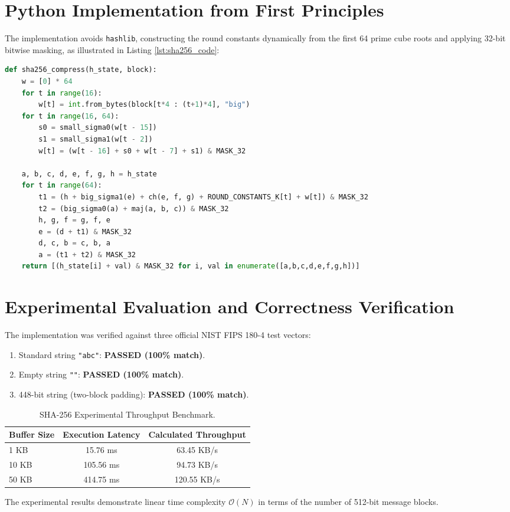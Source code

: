 \clearpage
\section{Python Implementation from First Principles}
The implementation avoids \texttt{hashlib}, constructing the round constants dynamically from the first 64 prime cube roots and applying 32-bit bitwise masking, as illustrated in Listing \ref{lst:sha256_code}:
\begin{lstlisting}[language=Python, caption={Core compression loop of SHA-256.}, label={lst:sha256_code}]
def sha256_compress(h_state, block):
    w = [0] * 64
    for t in range(16):
        w[t] = int.from_bytes(block[t*4 : (t+1)*4], "big")
    for t in range(16, 64):
        s0 = small_sigma0(w[t - 15])
        s1 = small_sigma1(w[t - 2])
        w[t] = (w[t - 16] + s0 + w[t - 7] + s1) & MASK_32

    a, b, c, d, e, f, g, h = h_state
    for t in range(64):
        t1 = (h + big_sigma1(e) + ch(e, f, g) + ROUND_CONSTANTS_K[t] + w[t]) & MASK_32
        t2 = (big_sigma0(a) + maj(a, b, c)) & MASK_32
        h, g, f = g, f, e
        e = (d + t1) & MASK_32
        d, c, b = c, b, a
        a = (t1 + t2) & MASK_32
    return [(h_state[i] + val) & MASK_32 for i, val in enumerate([a,b,c,d,e,f,g,h])]
\end{lstlisting}

\section{Experimental Evaluation and Correctness Verification}
The implementation was verified against three official NIST FIPS 180-4 test vectors:
\begin{enumerate}
    \item Standard string \texttt{"abc"}: \textbf{PASSED (100\% match)}.
    \item Empty string \texttt{""}: \textbf{PASSED (100\% match)}.
    \item 448-bit string (two-block padding): \textbf{PASSED (100\% match)}.
\end{enumerate}

\begin{table}[H]
\centering
\caption{SHA-256 Experimental Throughput Benchmark.}
\label{tab:sha_perf}
\begin{tabular}{lcc}
\toprule
\textbf{Buffer Size} & \textbf{Execution Latency} & \textbf{Calculated Throughput} \\
\midrule
1 KB  & 15.76 ms & 63.45 KB/s \\
10 KB & 105.56 ms & 94.73 KB/s \\
50 KB & 414.75 ms & 120.55 KB/s \\
\bottomrule
\end{tabular}
\end{table}
The experimental results demonstrate linear time complexity $\mathcal{O}(N)$ in terms of the number of 512-bit message blocks.

